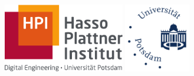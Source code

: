 \begin{titlepage}
    \begin{addmargin}[-0.25cm]{-0.25cm}
    \begin{center}
        \large  

        \hfill
        
        \vspace{1cm}
        
        \includegraphics[height=3cm]{figures/hpi_logo.pdf} 
        \hspace{15mm}
        \includegraphics[height=3cm]{figures/up_logo.pdf} \\ \bigskip
		
		\vspace{25mm}

		 \\ \bigskip

        \begingroup
            \color{Maroon}\spacedallcaps{\myTitle} \\ \bigskip
        \endgroup
        
        \begingroup
            \color{Maroon}\spacedlowsmallcaps{\myGermanTitle} \\
        \endgroup

		\vspace{1cm}

        \spacedallcaps{\myName} \\
        
        \vspace{2cm}
        
         \\ \smallskip
        \myDepartment \\
        

\end{center}
\end{addmargin}
\end{titlepage}
